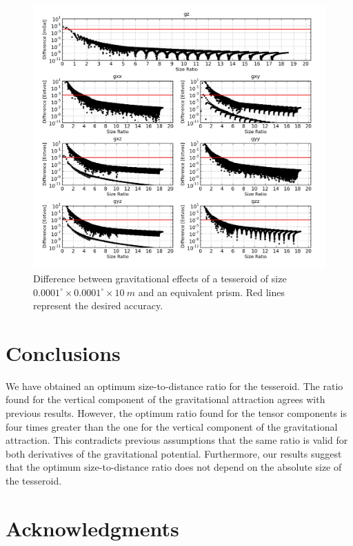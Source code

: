 \documentclass[a4paper,twocolumn]{esapub2005} %
\begin{document}
\begin{figure}[h]
    \centering
        \includegraphics[width=\textwidth]{../figures/comparison0_0001.png}
    \caption{Difference between gravitational effects of a tesseroid of size
    $0.0001^{\circ} \times 0.0001^{\circ} \times 10\ m$ and an equivalent prism.
    Red lines represent the desired accuracy.
    \label{fig:res-0.0001}}
\end{figure}

\section{Conclusions}

We have obtained an optimum size-to-distance ratio for the tesseroid.
The ratio found for the vertical component of the gravitational attraction agrees
with previous results.
However, the optimum ratio found for the tensor components is four times greater than
the one for the vertical component of the gravitational attraction.
This contradicts previous assumptions that the same ratio is valid for both derivatives
of the gravitational potential.
Furthermore, our results suggest that the optimum size-to-distance ratio does not depend
on the absolute size of the tesseroid.

\section*{Acknowledgments}
\end{document}
